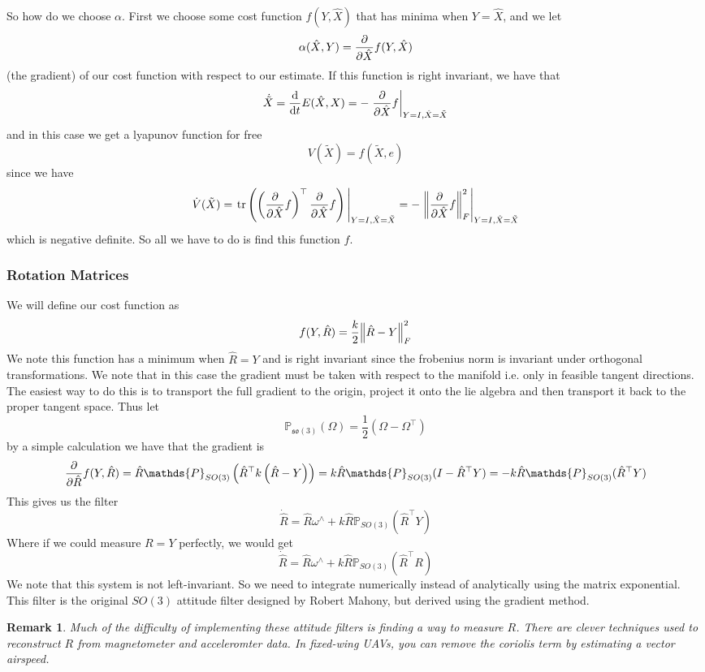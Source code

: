 \documentclass[a4paper]{article}
\newtheorem*{rem}{Remark}
\begin{document}
So how do we choose $\alpha$. First we choose some cost function $f(Y, \hat{X})$ that has minima when $Y = \hat{X}$, and we let
\[
  \alpha(\hat{X}, Y) = \pdv{}{\hat{X}} f(Y, \hat{X})
\]
(the gradient) of our cost function with respect to our estimate. If this function is right invariant, we have that
\[
  \dot{\tilde{X}} = \dv{}{t}E(\hat{X}, X) = -\eval{\pdv{}{\hat{X}}f}_{Y=I, \hat{X} = \tilde{X}}
\]
and in this case we get a lyapunov function for free
\[
  V(\tilde{X}) = f(\tilde{X}, e)
\]
since we have
\[
  \dot{V}(\tilde{X}) = \eval{\text{tr}\left( \left(\pdv{}{\hat{X}}f \right)^\top \pdv{}{\hat{X}}f\right)}_{Y=I, \hat{X} = \tilde{X}} = - \eval{\norm{\pdv{}{\hat{X}}f}_F^2}_{Y=I, \hat{X} = \tilde{X}}
\]
which is negative definite. So all we have to do is find this function $f$.

\subsubsection*{Rotation Matrices}%
We will define our cost function as 
\[
  f(Y, \hat{R}) = \frac{k}{2}\norm{\hat{R} - Y}^2_F
\]
We note this function has a minimum when $\hat{R}= Y$ and  is right invariant since the frobenius norm is invariant under orthogonal transformations. We note that in this case the gradient must be taken with respect to the manifold i.e. only in feasible tangent directions. The easiest way to do this is to transport the full gradient to the origin, project it onto the lie algebra and then transport it back to the proper tangent space. Thus let 
\[
  \mathds{P}_{\mathfrak{so}(3)}(\Omega) = \frac{1}{2}(\Omega - \Omega^\top)
\]
by a simple calculation we have that the gradient is
\[
  \pdv{}{\hat{R}} f(Y, \hat{R}) = \hat{R} \mathds{P}_{SO(3)} \left( \hat{R}^\top k\left(\hat{R} - Y \right) \right) = k\hat{R}\mathds{P}_{SO(3)}(I - \hat{R}^\top Y) = -k\hat{R}\mathds{P}_{SO(3)}(\hat{R}^\top Y)
\]
This gives us the filter
\[
  \dot{\hat{R}} = \hat{R} \omega^\wedge + k \hat{R}\mathds{P}_{SO(3)}(\hat{R}^\top Y)
\]
Where if we could measure $R = Y$ perfectly, we would get 
\[
  \dot{\hat{R}} = \hat{R} \omega^\wedge + k \hat{R}\mathds{P}_{SO(3)}(\hat{R}^\top R)
\]
We note that this system is not left-invariant. So we need to integrate numerically instead of analytically using the matrix exponential. This filter is the original $SO(3)$ attitude filter designed by Robert Mahony, but derived using the gradient method.

\begin{rem}
  Much of the difficulty of implementing these attitude filters is finding a way to measure $R$. There are clever techniques used to reconstruct $R$ from magnetometer and acceleromter data. In fixed-wing UAVs, you can remove the coriolis term by estimating a vector airspeed.
\end{rem}
\end{document}
